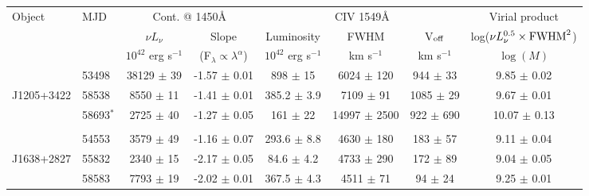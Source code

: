 \documentclass{article}
\begin{document}
\begin{table}
  \small
  \begin{centering}
    \begin{tabular}{l | l | c c | c c c | c}
      \hline
      \hline
        Object         &  MJD         &  \multicolumn{2}{c}{Cont. @ 1450\AA }                        &   \multicolumn{3}{c}{CIV 1549\AA}                                   & Virial product \\
                       &              &       $\nu L_{\nu}$    &         Slope                       &   Luminosity             &     FWHM           &    V$_{\rm off}$    & log($\nu L_{\nu}^{0.5} \times {\rm FWHM}^2$)\\
                       &              & $10^{42}$ erg s$^{-1}$ & (F$_\lambda \propto \lambda^\alpha$)  & $10^{42}$ erg s$^{-1}$ &     km s$^{-1}$    &    km s$^{-1}$      &  $\log(M)$ \\
      \hline                        
                       &  53498       &  38129   $\pm$ 39      &  -1.57 $\pm$ 0.01                   &  898    $\pm$ 15         &   6024 $\pm$  120  &     944 $\pm$  33   &   9.85 $\pm$ 0.02\\
          J1205+3422   &  58538       &   8550   $\pm$ 11      &  -1.41 $\pm$ 0.01                   &  385.2  $\pm$  3.9       &   7109 $\pm$   91  &    1085 $\pm$  29   &   9.67 $\pm$ 0.01\\  
                       &  58693$^*$   &   2725   $\pm$ 40      &  -1.27 $\pm$ 0.05                   &  161    $\pm$ 22         &  14997 $\pm$ 2500  &     922 $\pm$ 690   &  10.07 $\pm$ 0.13\\  
                                      &                        &                                     &                          &                    &                     &                  \\
                       &  54553       &   3579   $\pm$ 49      &  -1.16 $\pm$ 0.07                   &  293.6  $\pm$  8.8       &   4630 $\pm$  180  &     183 $\pm$  57   &   9.11 $\pm$ 0.04\\  
          J1638+2827   &  55832       &   2340   $\pm$ 15      &  -2.17 $\pm$ 0.05                   &   84.6  $\pm$  4.2       &   4733 $\pm$  290  &     172 $\pm$  89   &   9.04 $\pm$ 0.05\\  
                       &  58583       &   7793   $\pm$ 19      &  -2.02 $\pm$ 0.01                   &  367.5  $\pm$  4.3       &   4511 $\pm$   71  &      94 $\pm$  24   &   9.25 $\pm$ 0.01\\  

\end{tabular}
\end{centering}
\end{table}
\end{document}
